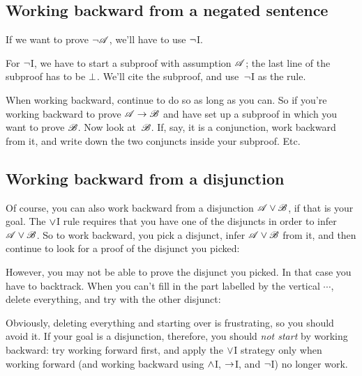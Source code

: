 \subsection*{Working backward from a negated sentence}

If we want to prove $\neg \mathscr{A}$, we'll have to use $\neg$I.
\begin{fitchproof}
\open
{}
\ellipsesline 
{}
\close
{}
\end{fitchproof} 
For $\neg$I, we have to start a subproof with assumption $\mathscr{A}$; the last line of the subproof has to be $\bot$.  We'll cite the subproof, and use~$\neg$I as the rule.

When working backward, continue to do so as long as you can. So if you're working backward to prove $\mathscr{A} \rightarrow \mathscr{B}$ and have set up a subproof in which you want to prove $\mathscr{B}$. Now look at~$\mathscr{B}$. If, say, it is a conjunction, work backward from it, and write down the two conjuncts inside your subproof. Etc.

\subsection*{Working backward from a disjunction}

Of course, you can also work backward from a disjunction $\mathscr{A} \vee \mathscr{B}$, if that is your goal.
The $\vee$I rule requires that you have one of the disjuncts in order to infer $\mathscr{A} \vee \mathscr{B}$.
So to work backward, you pick a disjunct, infer $\mathscr{A} \vee \mathscr{B}$ from it, and then continue to look for a proof of the disjunct you picked:
\begin{fitchproof}
	\ellipsesline
\end{fitchproof}
However, you may not be able to prove the disjunct you picked. In that
case you have to backtrack. When you can't fill in the part labelled
by the vertical $\cdots$,
delete everything, and try with the other disjunct:
\begin{fitchproof}
	\ellipsesline 
\end{fitchproof}
Obviously, deleting everything and starting over is frustrating, so you should avoid it. If your goal is a disjunction, therefore, you should \emph{not start} by working backward: try working forward first, and apply the $\vee$I strategy only when working forward (and working backward using $\wedge$I, $\rightarrow$I, and $\neg$I) no longer work.

